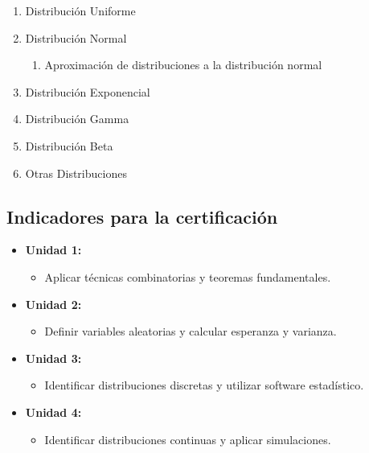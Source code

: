 \begin{itemize}
\begin{enumerate}
\item Distribuci\'on Uniforme
\item Distribuci\'on Normal
\begin{enumerate}
\item Aproximaci\'on de distribuciones a la distribuci\'on normal
\end{enumerate}
\item Distribuci\'on Exponencial
\item Distribuci\'on Gamma
\item Distribuci\'on Beta
\item Otras Distribuciones
\end{enumerate}

\end{itemize}


\subsection{Indicadores para la certificaci\'on}\medskip

\begin{itemize}
\item \textbf{Unidad 1:}
\begin{itemize}
  \item Aplicar t\'ecnicas combinatorias y teoremas fundamentales.
\end{itemize}

\item \textbf{Unidad 2:}
\begin{itemize}
  \item Definir variables aleatorias y calcular esperanza y varianza.
\end{itemize}

\item \textbf{Unidad 3:}
\begin{itemize}
  \item Identificar distribuciones discretas y utilizar software estad\'istico.
\end{itemize}

\item \textbf{Unidad 4:}
\begin{itemize}
  \item Identificar distribuciones continuas y aplicar simulaciones.
\end{itemize}
\end{itemize}

